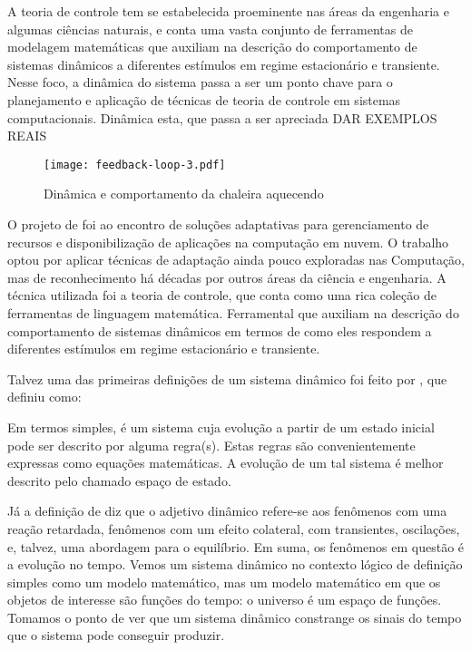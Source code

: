 A teoria de controle tem se estabelecida proeminente nas áreas da engenharia e algumas ciências naturais, e conta uma vasta conjunto de ferramentas de modelagem matemáticas que auxiliam na descrição do comportamento de sistemas dinâmicos a diferentes estímulos em regime estacionário e transiente. Nesse foco, a dinâmica do sistema passa a ser um ponto chave para o planejamento e aplicação de técnicas de teoria de controle em sistemas computacionais. Dinâmica esta, que passa a ser apreciada DAR EXEMPLOS REAIS 

\begin{figure}[htb]
	\caption{Dinâmica e comportamento da chaleira aquecendo}
	\label{fig:feedback-nobile}
	\centering
	\texttt{[image: feedback-loop-3.pdf]}
\end{figure}

O projeto de \cite{Nobile2013} foi ao encontro de soluções adaptativas para gerenciamento de recursos e disponibilização de aplicações na computação em nuvem. O trabalho optou por aplicar técnicas de adaptação ainda pouco exploradas nas Computação, mas de reconhecimento há décadas por outros áreas da ciência e engenharia. A técnica utilizada foi a teoria de controle, que conta como uma rica coleção de ferramentas de linguagem matemática. Ferramental que auxiliam na descrição do comportamento de sistemas dinâmicos em termos de como eles respondem a diferentes estímulos em regime estacionário e transiente.

Talvez uma das primeiras definições de um sistema dinâmico foi feito por \cite{tsonis1989} , que definiu como:
\begin{citacao}
	Em termos simples, é um sistema cuja evolução a partir de um estado inicial pode ser descrito por alguma regra(s). Estas regras são convenientemente expressas como equações matemáticas. A evolução de um tal sistema é melhor descrito pelo chamado espaço de estado.
\end{citacao}

Já a definição de \cite{willems2013} diz que o adjetivo dinâmico refere-se aos fenômenos com uma reação retardada, fenômenos com um efeito colateral, com transientes, oscilações, e, talvez, uma abordagem para o equilíbrio. Em suma, os fenômenos em questão é a evolução no tempo. Vemos um sistema dinâmico no contexto lógico de definição simples como um modelo matemático, mas um modelo matemático em que os objetos de interesse são funções do tempo: o universo é um espaço de funções. Tomamos o ponto de ver que um sistema dinâmico constrange os sinais do tempo que o sistema pode conseguir produzir.

